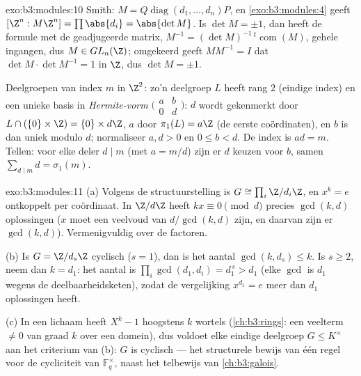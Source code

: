 \begin{solution}{exo:b3:modules:10}
Smith: $M = Q\operatorname{diag}(d_1,\dots,d_n)P$, en
\cref{exo:b3:modules:4} geeft $[\Z^n : M\Z^n] = \prod\abs{d_i} =
\abs{\det M}$. Is $\det M = \pm 1$, dan heeft de formule met de
geadjugeerde matrix, $M^{-1} = (\det
M)^{-1}\,{}^{t}\!\operatorname{com}(M)$, gehele ingangen, dus $M
\in GL_n(\Z)$; omgekeerd geeft $MM^{-1} = I$ dat $\det M \cdot
\det M^{-1} = 1$ in $\Z$, dus $\det M = \pm1$.

Deelgroepen van index $m$ in $\Z^2$: zo'n deelgroep $L$ heeft rang
$2$ (eindige index) en een unieke basis in \emph{Hermite-vorm}
$\bigl(\begin{smallmatrix} a & b\\ 0 & d\end{smallmatrix}\bigr)$:
$d$ wordt gekenmerkt door $L \cap (\{0\} \times \Z) = \{0\} \times
d\Z$, $a$ door $\pi_1(L) = a\Z$ (de eerste coördinaten), en $b$ is
dan uniek modulo $d$; normaliseer $a, d > 0$ en $0 \leq b < d$. De
index is $ad = m$. Tellen: voor elke deler $d \mid m$ (met $a =
m/d$) zijn er $d$ keuzen voor $b$, samen $\sum_{d \mid m} d =
\sigma_1(m)$.
\end{solution}

\begin{solution}{exo:b3:modules:11}
(a) Volgens de structuurstelling is $G \cong \prod_i\Z/d_i\Z$, en
$x^k = e$ ontkoppelt per coördinaat. In $\Z/d\Z$ heeft $kx \equiv
0 \pmod d$ precies $\gcd(k, d)$ oplossingen ($x$ moet een veelvoud
van $d/\gcd(k,d)$ zijn, en daarvan zijn er $\gcd(k, d)$).
Vermenigvuldig over de factoren.

(b) Is $G = \Z/d_s\Z$ cyclisch ($s = 1$), dan is het aantal
$\gcd(k, d_s) \leq k$. Is $s \geq 2$, neem dan $k = d_1$: het
aantal is $\prod_i\gcd(d_1, d_i) = d_1^{\,s} > d_1$ (elke $\gcd$
is $d_1$ wegens de deelbaarheidsketen), zodat de vergelijking
$x^{d_1} = e$ meer dan $d_1$ oplossingen heeft.

(c) In een lichaam heeft $X^k - 1$ hoogstens $k$ wortels
(\cref{ch:b3:rings}: een veelterm $\neq 0$ van graad $k$ over een
domein), dus voldoet elke eindige deelgroep $G \leq K^\times$ aan
het criterium van (b): $G$ is cyclisch --- het structurele bewijs
van één regel voor de cycliciteit van $\mathbb F_q^\times$, naast
het telbewijs van \cref{ch:b3:galois}.
\end{solution}


